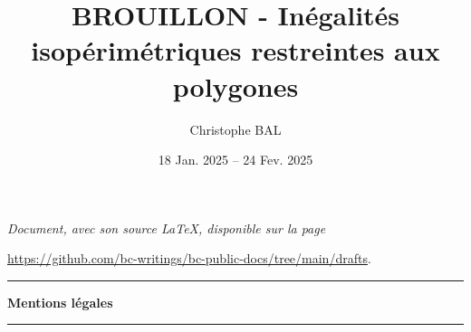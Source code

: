 \documentclass[12pt]{amsart}
\begin{document}
\title{BROUILLON - Inégalités isopérimétriques restreintes aux polygones}
\author{Christophe BAL}
\date{18 Jan. 2025 -- 24 Fev. 2025}

\maketitle

\begin{center}
	\itshape
	Document, avec son source \LaTeX, disponible sur la page

	\url{https://github.com/bc-writings/bc-public-docs/tree/main/drafts}.
\end{center}


\bigskip


\begin{center}
	\hrule\vspace{.3em}
	{
		\fontsize{1.35em}{1em}\selectfont
		\textbf{Mentions \og légales \fg}
	}

	\vspace{0.45em}
	\doclicenseThis
	\hrule
\end{center}



\setcounter{tocdepth}{2}
\tableofcontents




\newpage
\end{document}
